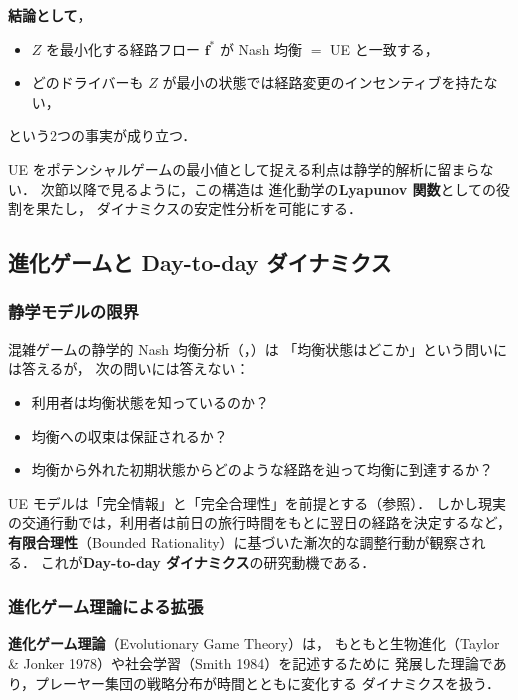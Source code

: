\textbf{結論として}，
\begin{itemize}
  \item $Z$ を最小化する経路フロー $\boldsymbol{f}^*$ が Nash 均衡 $=$ UE と一致する，
  \item どのドライバーも $Z$ が最小の状態では経路変更のインセンティブを持たない，
\end{itemize}
という2つの事実が成り立つ\cite{Sandholm2001}．

UE をポテンシャルゲームの最小値として捉える利点は静学的解析に留まらない．
次節以降で見るように，この構造は
進化動学の\textbf{Lyapunov 関数}としての役割を果たし，
ダイナミクスの安定性分析を可能にする．

\subsection{進化ゲームと Day-to-day ダイナミクス}
\label{subsec:evo-game-overview}

\subsubsection*{静学モデルの限界}

混雑ゲームの静学的 Nash 均衡分析（，）は
「均衡状態はどこか」という問いには答えるが，
次の問いには答えない：

\begin{itemize}
  \item 利用者は均衡状態を知っているのか？
  \item 均衡への収束は保証されるか？
  \item 均衡から外れた初期状態からどのような経路を辿って均衡に到達するか？
\end{itemize}

UE モデルは「完全情報」と「完全合理性」を前提とする（参照）．
しかし現実の交通行動では，利用者は前日の旅行時間をもとに翌日の経路を決定するなど，
\textbf{有限合理性}（Bounded Rationality）に基づいた漸次的な調整行動が観察される．
これが\textbf{Day-to-day ダイナミクス}の研究動機である．

\subsubsection*{進化ゲーム理論による拡張}

\textbf{進化ゲーム理論}（Evolutionary Game Theory）は，
もともと生物進化（Taylor \& Jonker 1978）や社会学習（Smith 1984）を記述するために
発展した理論であり，プレーヤー集団の戦略分布が時間とともに変化する
ダイナミクスを扱う\cite{Taylor1978,Smith1984}．

